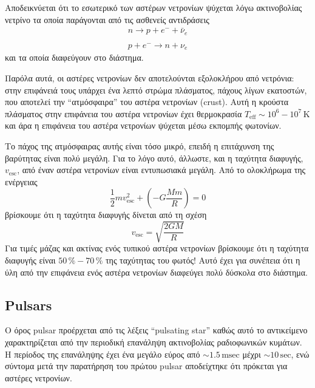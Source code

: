 Αποδεικνύεται ότι το εσωτερικό των αστέρων νετρονίων ψύχεται λόγω ακτινοβολίας νετρίνο τα οποία παράγονται από τις ασθενείς αντιδράσεις
\begin{eqnarray*}
	n \longrightarrow p + e^{-} + \bar{\nu}_e \\ \\
    p + e^{-} \longrightarrow n + \nu_e
\end{eqnarray*}
και τα οποία διαφεύγουν στο διάστημα.

Παρόλα αυτά, οι αστέρες νετρονίων δεν αποτελούνται εξολοκλήρου από νετρόνια: στην επιφάνειά τους υπάρχει ένα λεπτό στρώμα πλάσματος, πάχους λίγων εκατοστών, που αποτελεί την ``ατμόσφαιρα'' του αστέρα νετρονίων (crust). Αυτή η κρούστα πλάσματος στην επιφάνεια του αστέρα νετρονίων έχει θερμοκρασία $T_{\text{eff}}\sim 10^6 - 10^7\,\text{K}$ και άρα η επιφάνεια του αστέρα νετρονίων ψύχεται μέσω εκπομπής φωτονίων.

Το πάχος της ατμόσφαιρας αυτής είναι τόσο μικρό, επειδή η επιτάχυνση της βαρύτητας είναι πολύ μεγάλη. Για το λόγο αυτό, άλλωστε, και η ταχύτητα διαφυγής, $v_{\text{esc}}$, από έναν αστέρα νετρονίων είναι εντυπωσιακά μεγάλη. Από το ολοκλήρωμα της ενέργειας
\begin{equation*}
	\frac{1}{2} m v_{\text{esc}}^2 + \left( - G \frac{M m}{R} \right) = 0
\end{equation*}
βρίσκουμε ότι η ταχύτητα διαφυγής δίνεται από τη σχέση
\begin{equation}
	v_{\text{esc}} = \sqrt{\frac{2GM}{R}}
    \label{eq:escape_velocity}
\end{equation}
Για τιμές μάζας και ακτίνας ενός τυπικού αστέρα νετρονίων βρίσκουμε ότι η ταχύτητα διαφυγής είναι $50\,\% - 70\,\%$ της ταχύτητας του φωτός! Αυτό έχει για συνέπεια ότι η ύλη από την επιφάνεια ενός αστέρα νετρονίων διαφεύγει πολύ δύσκολα στο διάστημα.
 
\subsection{Pulsars}
Ο όρος pulsar προέρχεται από τις λέξεις ``pulsating star'' καθώς αυτό το αντικείμενο χαρακτηρίζεται από την περιοδική επανάληψη ακτινοβολίας ραδιοφωνικών κυμάτων. Η περίοδος της επανάληψης έχει ένα μεγάλο εύρος από $\sim 1.5\,\text{msec}$ μέχρι $\sim 10\,\text{sec}$, ενώ σύντομα μετά την παρατήρηση του πρώτου pulsar αποδείχτηκε ότι πρόκεται για αστέρες νετρονίων.

